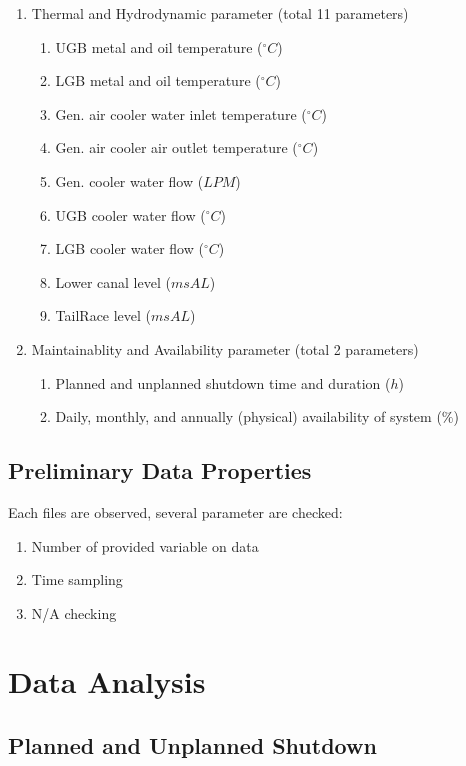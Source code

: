 \documentclass[11pt,a4paper,twoside,onecolumn]{book}
\begin{document}
\begin{enumerate}
			\item Thermal and Hydrodynamic parameter (total 11 parameters)
			\begin{enumerate}
				\item UGB metal and oil temperature (\(^{\circ} C\))
				\item LGB metal and oil temperature (\(^{\circ} C\))
				\item Gen. air cooler water inlet temperature (\(^{\circ} C\))
				\item Gen. air cooler air outlet temperature (\(^{\circ} C\))
				\item Gen. cooler water flow (\(LPM\))
				\item UGB cooler water flow (\(^{\circ} C\))
				\item LGB cooler water flow (\(^{\circ} C\))
				\item Lower canal level (\(msAL\))
				\item TailRace level (\(msAL\))
			\end{enumerate}
			
			\item Maintainablity and Availability parameter (total 2 parameters)
			\begin{enumerate}
				\item Planned and unplanned shutdown time and duration (\(h\))
				\item Daily, monthly, and annually (physical) availability of system (\(\%\))
			\end{enumerate}
		\end{enumerate}
	
	\section{Preliminary Data Properties}
	Each files are observed, several parameter are checked:
		\begin{enumerate}
			\item Number of provided variable on data
			\item Time sampling 
			\item N/A checking 
		\end{enumerate}
		
	
	
	\chapter{Data Analysis}
	
		\section{Planned and Unplanned Shutdown}
		
\end{document}
